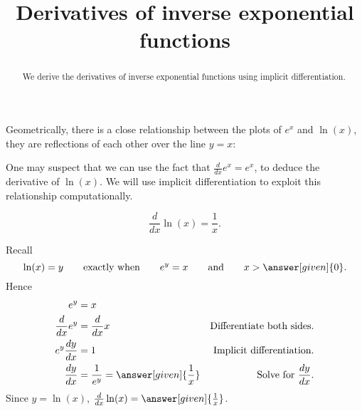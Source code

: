 \documentclass{ximera}
\title[Dig-In:]{Derivatives of inverse exponential functions}
\begin{document}
\begin{abstract}
  We derive the derivatives of inverse exponential functions using
  implicit differentiation.
\end{abstract}
\maketitle


Geometrically, there is a close relationship between the plots of
$e^x$ and $\ln(x)$, they are reflections of each other over the line
$y=x$:
\begin{image}
\end{image}
One may suspect that we can use the fact that $\frac{d}{dx} e^x = e^x$, to
deduce the derivative of $\ln(x)$.  We will use implicit
differentiation to exploit this relationship computationally.

\begin{theorem}
\[
\frac{d}{dx} \ln(x) = \frac{1}{x}.
\]
\begin{explanation}
  Recall
\[
\ln(x) = y \qquad\text{exactly when}\qquad e^y = x\qquad\text{and}\qquad x>\answer[given]{0}.
\]
Hence
\begin{align*}
e^y &= x\\
\frac{d}{dx} e^y &= \frac{d}{dx} x &\text{Differentiate both sides.}\\
e^y \frac{dy}{dx} &= 1 &\text{Implicit differentiation.}\\
\frac{dy}{dx} &= \frac{1}{e^y} = \answer[given]{\frac{1}{x}}&\text{Solve for $\frac{dy}{dx}$.}
\end{align*}
Since $y=\ln(x)$, $\frac{d}{dx} \ln(x) = \answer[given]{\frac{1}{x}}$.
\end{explanation}
\end{theorem}
\end{document}
